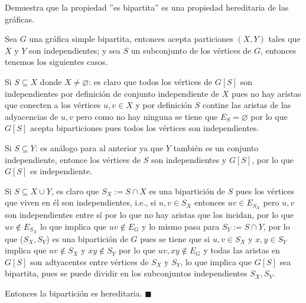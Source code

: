 Demuestra que la propiedad ''es bipartita'' es una propiedad hereditaria de las gráficas.

Sea $G$ una gráfica simple bipartita, entonces acepta particiones $(X,Y)$ tales que $X \text{ y } Y$ son independientes; y sea $S$ un subconjunto de los vértices de $G$, entonces tenemos los siguientes casos.

Si $S\subseteq X$ donde $X\neq\varnothing$: es claro que todos los vértices de $G\left[S\right]$ son independientes por definición de conjunto independiente de $X$ pues no hay arístas que conecten a los vértices $u,v\in X$ y por definición $S$ contine las aristas de las adyacencias de $u,v$ pero como no hay ninguna se tiene que $E_S=\varnothing$ por lo que $G\left[S\right]$ acepta biparticiones pues todos los vértices son independientes. 

Si $S\subseteq Y$: es análogo para al anterior ya que $Y$ también es un conjunto independiente, entonce los vértices de $S$ son independientes y $G\left[S\right]$, por lo que $G\left[S\right]$ es independiente.

Si $S\subseteq X\cup Y$, es claro que $S_X:=S\cap X$ es una bipartición de $S$ pues los vértices que viven en él son independientes, i.e., si $u,v\in S_X$ entonces $uv\in E_{S_X}$ pero $u,v$ son independientes entre sí por lo que no hay aristas que los incidan, por lo que $uv\notin E_{S_X}$ lo que implica que $uv\notin E_G$ y lo mismo pasa para $S_Y:=S\cap Y$, por lo que ($S_X, S_Y$) es una bipartición de $G$ pues se tiene que si $u,v\in S_X$ y $x,y\in S_Y$ implica que $uv\notin S_X$ y $xy\notin S_Y$ por lo que $uv,xy\notin E_G$ y todas las aristas en $G\left[S\right]$ son adtyacentes entre vértices de $S_X$ y $S_Y$, lo que implica que $G\left[S\right]$ sea bipartita, pues se puede dividir en los subconjuntos independientes $S_X,S_Y$.

Entonces la bipartición es hereditaria. $\blacksquare$